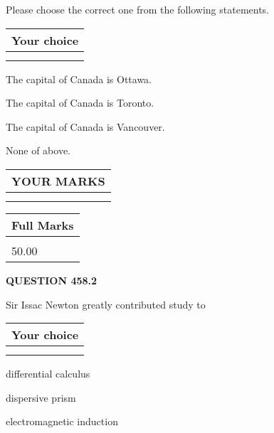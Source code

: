 \documentclass[12pt]{article}
\begin{document}
  
Please choose the correct one from the following statements.
  
  
\noindent\hspace{3.0in} \begin{tabular}{|l|}
\hline
Your choice \\
\hline
 \\ 
 \\ 
\hline
\end{tabular}
  
  
 
 
The capital of Canada is Ottawa.
 
 
The capital of Canada is Toronto.
 
 
The capital of Canada is Vancouver.
 
 
 None of above.
 
 
  
\vspace{0.2in}
  
\noindent\begin{tabular}{|l|}
\hline
 YOUR MARKS  \\
\hline
 \\ 
 \\ 
\hline
\end{tabular}
\hspace{0.05in} \begin{tabular}{|l|}
\hline
 Full Marks  \\
\hline
 \\ 
50.00 \\
\hline
\end{tabular}
{\textbf{\Large{QUESTION
458.2 
}}}
  
  
Sir Issac Newton greatly contributed study to
  
  
\noindent\hspace{3.0in} \begin{tabular}{|l|}
\hline
Your choice \\
\hline
 \\ 
 \\ 
\hline
\end{tabular}
  
  
 
 
differential calculus
 
 
dispersive prism
 
 
electromagnetic induction
 
\end{document}
